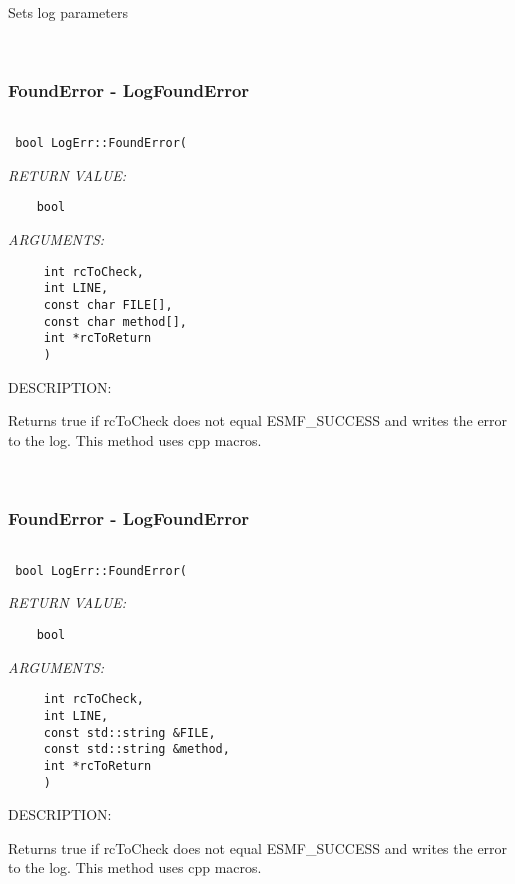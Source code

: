 {   Sets log parameters 
 
\mbox{}\hrulefill\ 
 
\subsubsection [FoundError] {FoundError - LogFoundError}


  
\begin{verbatim} 
 
 bool LogErr::FoundError(
 \end{verbatim}{\em RETURN VALUE:}
\begin{verbatim}    bool\end{verbatim}{\em ARGUMENTS:}
\begin{verbatim}     int rcToCheck,
     int LINE,
     const char FILE[],
     const char method[],
     int *rcToReturn
     )\end{verbatim}
{\sf DESCRIPTION:\\ }


   Returns true if rcToCheck does not equal ESMF\_SUCCESS and writes the error
   to the log.  This method uses cpp macros. 
 
\mbox{}\hrulefill\ 
 
\subsubsection [FoundError] {FoundError - LogFoundError}


  
\begin{verbatim} 
 
 bool LogErr::FoundError(
 \end{verbatim}{\em RETURN VALUE:}
\begin{verbatim}    bool\end{verbatim}{\em ARGUMENTS:}
\begin{verbatim}     int rcToCheck,
     int LINE,
     const std::string &FILE,
     const std::string &method,
     int *rcToReturn
     )\end{verbatim}
{\sf DESCRIPTION:\\ }


   Returns true if rcToCheck does not equal ESMF\_SUCCESS and writes the error
   to the log.  This method uses cpp macros. 
 
}
